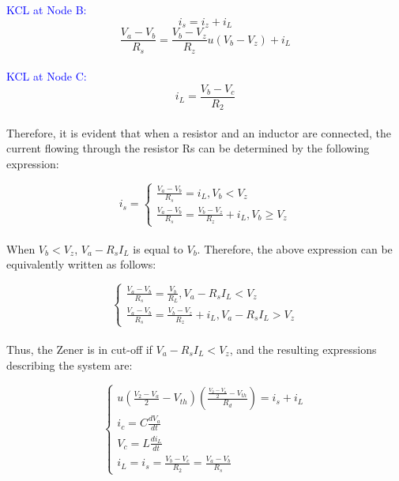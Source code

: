 \textcolor{blue}{KCL at Node B:}\\
\begin{equation}
    i_s=i_z+i_L
\end{equation}
\begin{equation}
    \frac{V_a-V_b}{R_s}=\frac{V_b-V_z}{R_z}u(V_b-V_z)+i_L
\end{equation}\\

\textcolor{blue}{KCL at Node C:}\\
\begin{equation}
    i_L=\frac{V_b-V_c}{R_2}
\end{equation}\\

Therefore, it is evident that when a resistor and an inductor are connected, the current flowing through the resistor Rs can be determined by the following expression:

\begin{equation}
     i_s=\begin{cases}
        \frac{V_a-V_b}{R_s}=i_L,  V_b<V_z\\
        \frac{V_a-V_b}{R_s}=\frac{V_b-V_z}{R_z}+i_L,  V_b \geq V_z
        \end{cases}
\end{equation}\\

When $V_b < V_z$, $V_a - R_sI_L$ is equal to $V_b$. Therefore, the above expression can be equivalently written as follows:

\begin{equation}
    \begin{cases}
        \frac{V_a-V_b}{R_s}=\frac{V_b}{R_L}, V_a-R_sI_L<V_z\\
        \frac{V_a-V_b}{R_s}=\frac{V_b-V_z}{R_z}+i_L, V_a-R_sI_L>V_z
    \end{cases}
\end{equation}\\

Thus, the Zener is in cut-off if $V_a - R_sI_L < V_z$, and the resulting expressions describing the system are:

\begin{equation}
    \begin{cases}
        u(\frac{V_2-V_a}{2}-V_{th})(\frac{\frac{V_2-V_a}{2}-V_{th}}{R_d})=i_s+i_L\\
        i_c=C\frac{dV_a}{dt}\\
        V_c=L\frac{di_L}{dt}\\
        i_L=i_s=\frac{V_b-V_c}{R_2}=\frac{V_a-V_b}{R_s}
    \end{cases}
\end{equation}\\

